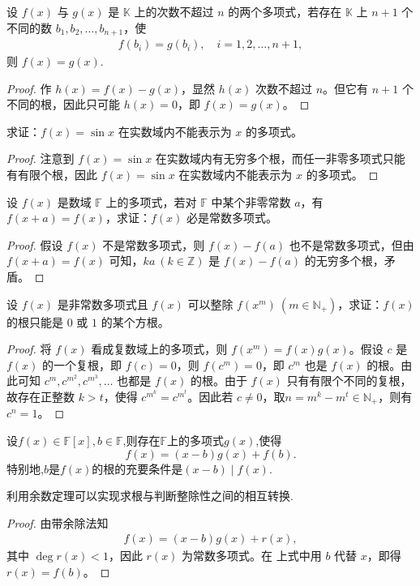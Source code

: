 \documentclass[../../main.tex]{subfiles}
\begin{document}
\begin{corollary}[两个多项式相等的判定准则]\label{corollary:两个多项式相等的判定准则}
设 $f(x)$ 与 $g(x)$ 是 $\mathbb{K}$ 上的次数不超过 $n$ 的两个多项式，若存在 $\mathbb{K}$ 上 $n + 1$ 个不同的数 $b_1, b_2, \ldots, b_{n+1}$，使
\begin{align*}
f(b_i) = g(b_i), \quad i = 1, 2, \ldots, n + 1,
\end{align*}
则 $f(x) = g(x)$.
\end{corollary}
\begin{proof}
作 $h(x) = f(x) - g(x)$，显然 $h(x)$ 次数不超过 $n$。但它有 $n + 1$ 个不同的根，因此只可能 $h(x) = 0$，即 $f(x) = g(x)$。
\end{proof}

\begin{example}
求证：$f(x) = \sin x$ 在实数域内不能表示为 $x$ 的多项式。
\end{example}
\begin{proof}
注意到 $f(x) = \sin x$ 在实数域内有无穷多个根，而任一非零多项式只能有有限个根，因此 $f(x) = \sin x$ 在实数域内不能表示为 $x$ 的多项式。
\end{proof}

\begin{example}
设 $f(x)$ 是数域 $\mathbb{F}$ 上的多项式，若对 $\mathbb{F}$ 中某个非零常数 $a$，有 $f(x + a) = f(x)$，求证：$f(x)$ 必是常数多项式。
\end{example}
\begin{proof}
假设 $f(x)$ 不是常数多项式，则 $f(x) - f(a)$ 也不是常数多项式，但由 $f(x + a) = f(x)$ 可知，$ka \ (k \in \mathbb{Z})$ 是 $f(x) - f(a)$ 的无穷多个根，矛盾。
\end{proof}

\begin{example}
设 $f(x)$ 是非常数多项式且 $f(x)$ 可以整除 $f(x^m) \ (m \in \mathbb{N}_+)$，求证：$f(x)$ 的根只能是 $0$ 或 $1$ 的某个方根。
\end{example}
\begin{proof}
将 $f(x)$ 看成复数域上的多项式，则 $f(x^m) = f(x)g(x)$。假设 $c$ 是 $f(x)$ 的一个复根，即 $f(c) = 0$，则 $f(c^m) = 0$，即 $c^m$ 也是 $f(x)$ 的根。由此可知 $c^m, c^{m^2}, c^{m^3}, \ldots$ 也都是 $f(x)$ 的根。由于 $f(x)$ 只有有限个不同的复根，故存在正整数 $k>t$，使得 $c^{m^k} = c^{m^t}$。因此若 $c \neq 0$，取$n=m^k-m^t\in \mathbb{N}_+$，则有 $c^n = 1$。
\end{proof}


\begin{theorem}[余数定理]\label{theorem:余数定理}
设\(f(x)\in\mathbb{F}[x], b\in\mathbb{F}\),则存在\(\mathbb{F}\)上的多项式\(g(x)\),使得
\[
f(x)=(x - b)g(x)+f(b).
\]
特别地,\(b\)是\(f(x)\)的根的充要条件是\((x - b)\mid f(x)\).
\end{theorem}
\begin{note}
利用余数定理可以实现求根与判断整除性之间的相互转换.
\end{note}
\begin{proof}
由带余除法知
\begin{align*}
f(x) = (x - b)g(x) + r(x),
\end{align*}
其中 $\deg r(x) < 1$，因此 $r(x)$ 为常数多项式。在 上式中用 $b$ 代替 $x$，即得 $r(x) = f(b)$。
\end{proof}
\end{document}
